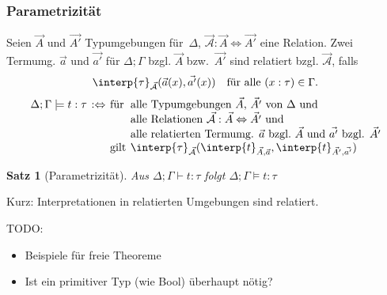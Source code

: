 \documentclass{beamer}
\newcommand{\defiff}{:\Leftrightarrow} %
\newcommand{\termInterp}[3]{\interp{#3}_{#1, #2}}
\newcommand{\relInterp}[2]{\interp{#2}_{#1}}
\newcommand{\Rel}[3]{#1 : #2 \Leftrightarrow #3}
\renewcommand{\emph}[1]{\textcolor{Emph}{#1}}
\newtheorem*{satz}{Satz}
\begin{document}
\begin{frame}
  \frametitle{Parametrizität}

  Seien $\vec{A}$ und $\vec{A'}$ Typumgebungen für~$\Delta$, $\Rel{\vec{\mathcal{A}}}{\vec{A}}{\vec{A'}}$ eine Relation.
  Zwei Termumg. $\vec{a}$ und $\vec{a'}$ für $\Delta; \Gamma$ bzgl. $\vec{A}$ bzw.~$\vec{A'}$ sind \emph{relatiert} bzgl. $\vec{\mathcal{A}}$, falls
  \[
    \relInterp{\vec{\mathcal{A}}}{\tau}(\vec{a}(x), \vec{a'}(x))
    \quad \text{für alle $(x : \tau) \in \Gamma$}.
  \]
  \[
    \arraycolsep=2pt
    \begin{array}{r c l l}
    \Delta; \Gamma \models t : \tau &\defiff
    &\text{für}& \text{alle Typumgebungen $\vec{A}$, $\vec{A'}$ von~$\Delta$ und} \\
    &&& \text{alle Relationen $\Rel{\vec{\mathcal{A}}}{\vec{A}}{\vec{A'}}$ und} \\
    &&& \text{alle relatierten Termumg. $\vec{a}$ bzgl.~$\vec{A}$ und $\vec{a'}$ bzgl. $\vec{A'}$} \\
    &&\text{gilt}& \relInterp{\vec{\mathcal{A}}}{\tau}(\termInterp{\vec{A}}{\vec{a}}{t}, \termInterp{\vec{A'}}{\vec{a'}}{t})
  \end{array}
  \]

  \begin{satz}[Parametrizität]
    Aus $\Delta; \Gamma \vdash t : \tau$ folgt $\Delta; \Gamma \models t : \tau$
  \end{satz}

  Kurz: Interpretationen in relatierten Umgebungen sind relatiert.
\end{frame}

\begin{frame}
  TODO:
  \begin{itemize}
    \item Beispiele für freie Theoreme
    \item Ist ein primitiver Typ (wie Bool) überhaupt nötig?
  \end{itemize}
\end{frame}
\end{document}
